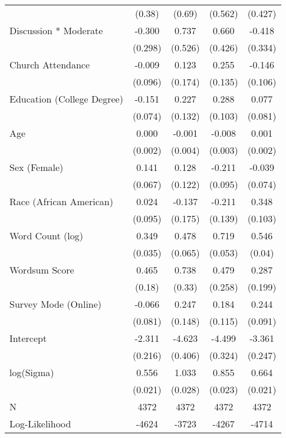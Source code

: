\begin{table}[ht]
\begin{tabular}{lcccc}
   & (0.38) & (0.69) & (0.562) & (0.427) \\ 
  Discussion * Moderate & -0.300 &  0.737 &  0.660 & -0.418 \\ 
   & (0.298) & (0.526) & (0.426) & (0.334) \\ 
  Church Attendance & -0.009 &  0.123 &  0.255 & -0.146 \\ 
   & (0.096) & (0.174) & (0.135) & (0.106) \\ 
  Education (College Degree) & -0.151 &  0.227 &  0.288 &  0.077 \\ 
   & (0.074) & (0.132) & (0.103) & (0.081) \\ 
  Age &  0.000 & -0.001 & -0.008 &  0.001 \\ 
   & (0.002) & (0.004) & (0.003) & (0.002) \\ 
  Sex (Female) &  0.141 &  0.128 & -0.211 & -0.039 \\ 
   & (0.067) & (0.122) & (0.095) & (0.074) \\ 
  Race (African American) &  0.024 & -0.137 & -0.211 &  0.348 \\ 
   & (0.095) & (0.175) & (0.139) & (0.103) \\ 
  Word Count (log) &  0.349 &  0.478 &  0.719 &  0.546 \\ 
   & (0.035) & (0.065) & (0.053) & (0.04) \\ 
  Wordsum Score &  0.465 &  0.738 &  0.479 &  0.287 \\ 
   & (0.18) & (0.33) & (0.258) & (0.199) \\ 
  Survey Mode (Online) & -0.066 &  0.247 &  0.184 &  0.244 \\ 
   & (0.081) & (0.148) & (0.115) & (0.091) \\ 
  Intercept & -2.311 & -4.623 & -4.499 & -3.361 \\ 
   & (0.216) & (0.406) & (0.324) & (0.247) \\ 
  log(Sigma) &  0.556 &  1.033 &  0.855 &  0.664 \\ 
   & (0.021) & (0.028) & (0.023) & (0.021) \\ 
   \hline
N & 4372 & 4372 & 4372 & 4372 \\ 
  Log-Likelihood & -4624 & -3723 & -4267 & -4714 \\ 
   \hline
\end{tabular}
\endgroup
\end{table}

